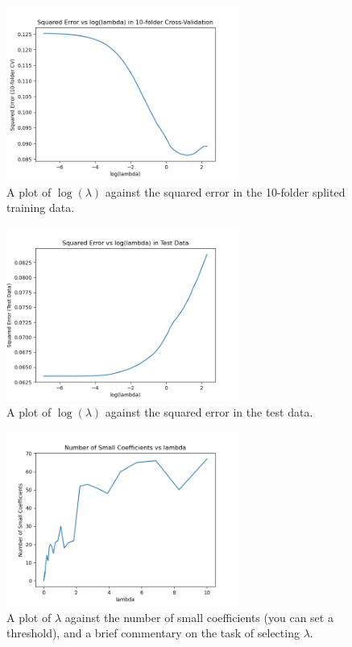 \documentclass[10pt]{article}
\begin{document}
\begin{figure}[h!]
	\centering
	\includegraphics[width=3in]{2-2.png}
	\caption{A plot of $\log(\lambda)$ against the squared error in the 10-folder splited training data.}
	\label{fig:svm_sol}
\end{figure}	


\begin{figure}[h!]
	\centering
	\includegraphics[width=3in]{2-3.png}
	\caption{A plot of $\log(\lambda)$ against the squared error in the test data.}
	\label{fig:svm_sol}
\end{figure}	


\begin{figure}[h!]
	\centering
	\includegraphics[width=3in]{2-4.png}
	\caption{A plot of $\lambda$ against the number of small coefficients (you can set a threshold), and a brief commentary on the task of selecting $\lambda$.}
	\label{fig:svm_sol}
\end{figure}	
\end{document}
